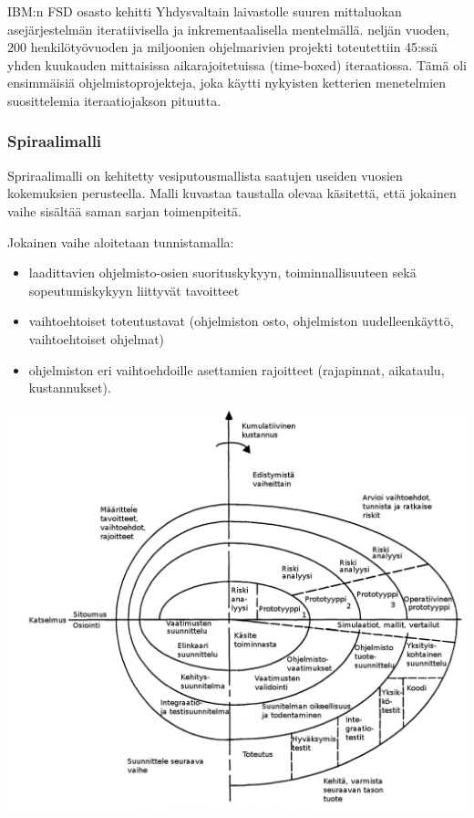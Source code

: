 \documentclass[finnish]{tktltiki2}
\theoremstyle{definition}
\theoremstyle{remark}
\begin{document}
IBM:n FSD osasto kehitti Yhdysvaltain laivastolle suuren mittaluokan asejärjestelmän iteratiivisella ja inkrementaalisella mentelmällä. neljän vuoden, 200 henkilötyövuoden ja miljoonien ohjelmarivien projekti toteutettiin 45:ssä yhden kuukauden mittaisissa aikarajoitetuissa (time-boxed) iteraatiossa. Tämä oli ensimmäisiä ohjelmistoprojekteja, joka käytti nykyisten ketterien menetelmien suosittelemia iteraatiojakson pituutta.\cite{LAB03}

\subsubsection{Spiraalimalli}

Spriraalimalli on kehitetty vesiputousmallista saatujen  useiden vuosien kokemuksien perusteella. Malli kuvastaa taustalla olevaa käsitettä, että jokainen vaihe sisältää saman sarjan toimenpiteitä.\cite{BOE88}

Jokainen vaihe aloitetaan tunnistamalla:
\begin{itemize}
  \item laadittavien ohjelmisto-osien suorituskykyyn, toiminnallisuuteen sekä sopeutumiskykyyn liittyvät tavoitteet
  \item vaihtoehtoiset toteutustavat (ohjelmiston osto, ohjelmiston uudelleenkäyttö, vaihtoehtoiset ohjelmat)
  \item ohjelmiston eri vaihtoehdoille asettamien rajoitteet (rajapinnat, aikataulu, kustannukset).
\end{itemize}\cite{BOE88}

\includegraphics[width=\textwidth]{spiral}
\end{document}
